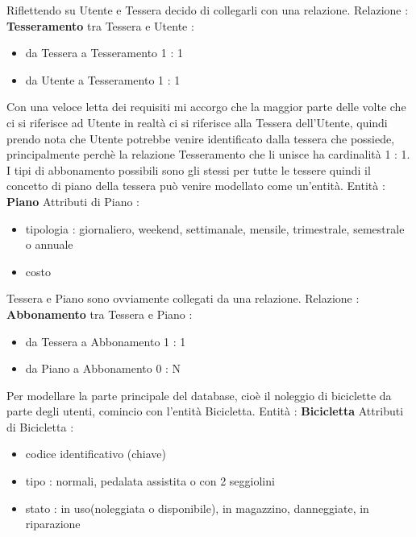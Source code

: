 \documentclass[a4paper,twoside]{article}
\begin{document}
Riflettendo su Utente e Tessera decido di collegarli con una relazione.\newline
Relazione : \textbf{Tesseramento} tra Tessera e Utente :
\begin{itemize}
 \item da Tessera a Tesseramento 1 : 1
 \item da Utente a Tesseramento 1 : 1
\end{itemize}
Con una veloce letta dei requisiti mi accorgo che la maggior parte delle volte che ci si riferisce ad Utente in realtà ci si riferisce alla Tessera dell'Utente, quindi prendo nota che Utente potrebbe venire identificato dalla tessera che possiede, principalmente perchè la relazione Tesseramento che li unisce ha cardinalità 1 : 1.\newline
I tipi di abbonamento possibili sono gli stessi per tutte le tessere quindi il concetto di piano della tessera può venire modellato come un'entità.\newline
Entità : \textbf{Piano}\newline
Attributi di Piano :
\begin{itemize}
 \item tipologia : giornaliero, weekend, settimanale, mensile, trimestrale, semestrale o annuale
 \item costo
\end{itemize}
Tessera e Piano sono ovviamente collegati da una relazione.\newline
Relazione : \textbf{Abbonamento} tra Tessera e Piano :
\begin{itemize}
 \item da Tessera a Abbonamento 1 : 1
 \item da Piano a Abbonamento 0 : N
\end{itemize}
Per modellare la parte principale del database, cioè il noleggio di biciclette da parte degli utenti, comincio con l'entità Bicicletta.\newline
Entità : \textbf{Bicicletta}\newline
Attributi di Bicicletta :
\begin{itemize}
 \item codice identificativo (chiave)
 \item tipo : normali, pedalata assistita o con 2 seggiolini
 \item stato : in uso(noleggiata o disponibile), in magazzino, danneggiate, in riparazione
\end{itemize}
\end{document}

